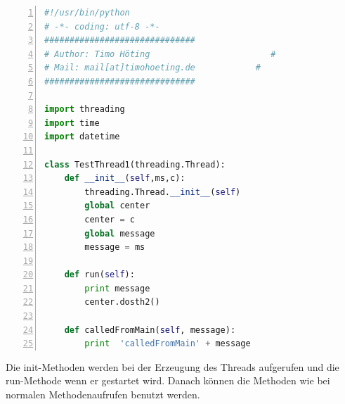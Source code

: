 \begin{lstlisting}[caption=Klasse TestThread1, language=python, frame=single, breaklines=true,columns=fullflexible, commentstyle=\color{gray}\upshape, captionpos=b, numbers = left]
#!/usr/bin/python
# -*- coding: utf-8 -*-
##############################
# Author: Timo Höting                        #
# Mail: mail[at]timohoeting.de            #
##############################

import threading
import time
import datetime

class TestThread1(threading.Thread):
    def __init__(self,ms,c):
        threading.Thread.__init__(self)
        global center
        center = c
        global message
        message = ms

    def run(self):
        print message
        center.dosth2()

    def calledFromMain(self, message):
        print  'calledFromMain' + message
\end{lstlisting}
Die init-Methoden werden bei der Erzeugung des Threads aufgerufen und die run-Methode wenn er gestartet wird. Danach können die Methoden wie bei normalen Methodenaufrufen benutzt werden. 